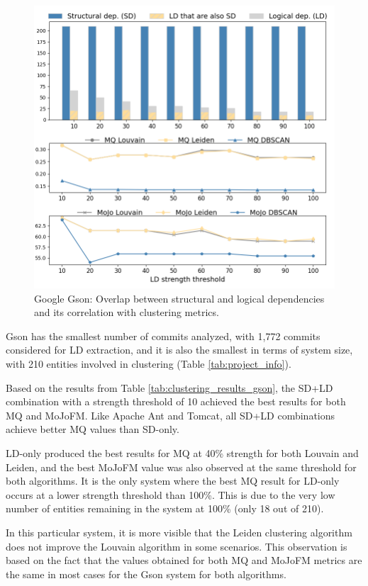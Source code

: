 \documentclass[12pt, a4paper, twoside]{report}
\begin{document}
\begin{figure}[t!]
  \centering
  \includegraphics[width=\columnwidth]{gson_correlation.png}
  \caption{Google Gson: Overlap between structural and logical dependencies and its correlation with clustering metrics.}
  \label{fig:gson_correlation}
\end{figure}

Gson has the smallest number of commits analyzed, with 1,772 commits considered for LD extraction, and it is also the smallest in terms of system size, with 210 entities involved in clustering (Table \ref{tab:project_info}).

Based on the results from Table \ref{tab:clustering_results_gson}, the SD+LD combination with a strength threshold of 10 achieved the best results for both MQ and MoJoFM. Like Apache Ant and Tomcat, all SD+LD combinations achieve better MQ values than SD-only.

LD-only produced the best results for MQ at 40\% strength for both Louvain and Leiden, and the best MoJoFM value was also observed at the same threshold for both algorithms. It is the only system where the best MQ result for LD-only occurs at a lower strength threshold than 100\%. This is due to the very low number of entities remaining in the system at 100\% (only 18 out of 210).

In this particular system, it is more visible that the Leiden clustering algorithm does not improve the Louvain algorithm in some scenarios. This observation is based on the fact that the values obtained for both MQ and MoJoFM metrics are the same in most cases for the Gson system for both algorithms.
\end{document}
